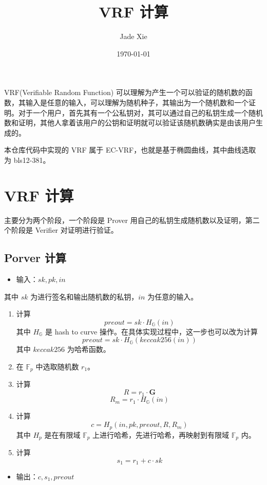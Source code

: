 \documentclass[10pt]{ctexart}
\title{VRF 计算}
\author{Jade Xie}
\date{\today}
\begin{document}
\maketitle

VRF(Verifiable Random Function) 可以理解为产生一个可以验证的随机数的函数，其输入是任意的输入，可以理解为随机种子，其输出为一个随机数和一个证明。对于一个用户，首先其有一个公私钥对，其可以通过自己的私钥生成一个随机数和证明，其他人拿着该用户的公钥和证明就可以验证该随机数确实是由该用户生成的。

本仓库代码中实现的 VRF 属于 EC-VRF，也就是基于椭圆曲线，其中曲线选取为 bls12-381。

\section{VRF 计算}

主要分为两个阶段，一个阶段是 Prover 用自己的私钥生成随机数以及证明，第二个阶段是 Verifier 对证明进行验证。

\subsection{Porver 计算}

\begin{itemize}
    \item 输入：$sk, pk, in$
\end{itemize}
其中 $sk$ 为进行签名和输出随机数的私钥，$in$ 为任意的输入。

\begin{enumerate}
    \item 计算 \[preout = sk \cdot H_{\mathbb{G}}(in)\] 其中 $H_{\mathbb{G}}$ 是 hash to curve 操作。在具体实现过程中，这一步也可以改为计算 \[preout = sk \cdot H_{\mathbb{G}}(keccak256(in))\] 其中 $keccak256$ 为哈希函数。
    \item 在 $\mathbb{F}_p$ 中选取随机数 $r_1$。
    \item 计算 \[ R = r_1 \cdot \mathbf{G} \] \[R_m = r_1 \cdot H_{\mathbb{G}}(in)\]
    \item 计算 \[c = H_p(in, pk, preout, R, R_m)\] 其中 $H_p$ 是在有限域 $\mathbb{F}_p$ 上进行哈希，先进行哈希，再映射到有限域 $\mathbb{F}_p$ 内。
    \item 计算 \[s_1 = r_1 + c \cdot sk\]
\end{enumerate}

\begin{itemize}
    \item 输出：$c, s_1, preout$
\end{itemize}
\end{document}
